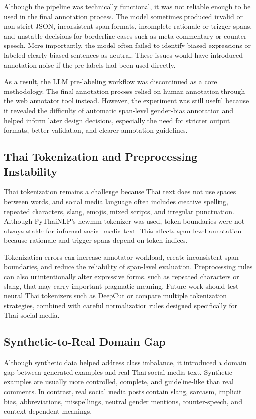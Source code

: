 \documentclass[12pt,oneside,openright,a4paper]{cpe-english-project}
\begin{document}
Although the pipeline was technically functional, it was not reliable enough to be used in the final annotation process. The model sometimes produced invalid or non-strict JSON, inconsistent span formats, incomplete rationale or trigger spans, and unstable decisions for borderline cases such as meta commentary or counter-speech. More importantly, the model often failed to identify biased expressions or labeled clearly biased sentences as neutral. These issues would have introduced annotation noise if the pre-labels had been used directly.

As a result, the LLM pre-labeling workflow was discontinued as a core methodology. The final annotation process relied on human annotation through the web annotator tool instead. However, the experiment was still useful because it revealed the difficulty of automatic span-level gender-bias annotation and helped inform later design decisions, especially the need for stricter output formats, better validation, and clearer annotation guidelines.

\subsection{Thai Tokenization and Preprocessing Instability}

Thai tokenization remains a challenge because Thai text does not use spaces between words, and social media language often includes creative spelling, repeated characters, slang, emojis, mixed scripts, and irregular punctuation. Although PyThaiNLP's newmm tokenizer was used, token boundaries were not always stable for informal social media text. This affects span-level annotation because rationale and trigger spans depend on token indices.

Tokenization errors can increase annotator workload, create inconsistent span boundaries, and reduce the reliability of span-level evaluation. Preprocessing rules can also unintentionally alter expressive forms, such as repeated characters or slang, that may carry important pragmatic meaning. Future work should test neural Thai tokenizers such as DeepCut or compare multiple tokenization strategies, combined with careful normalization rules designed specifically for Thai social media.

\subsection{Synthetic-to-Real Domain Gap}

Although synthetic data helped address class imbalance, it introduced a domain gap between generated examples and real Thai social-media text. Synthetic examples are usually more controlled, complete, and guideline-like than real comments. In contrast, real social media posts contain slang, sarcasm, implicit bias, abbreviations, misspellings, neutral gender mentions, counter-speech, and context-dependent meanings.
\end{document}
